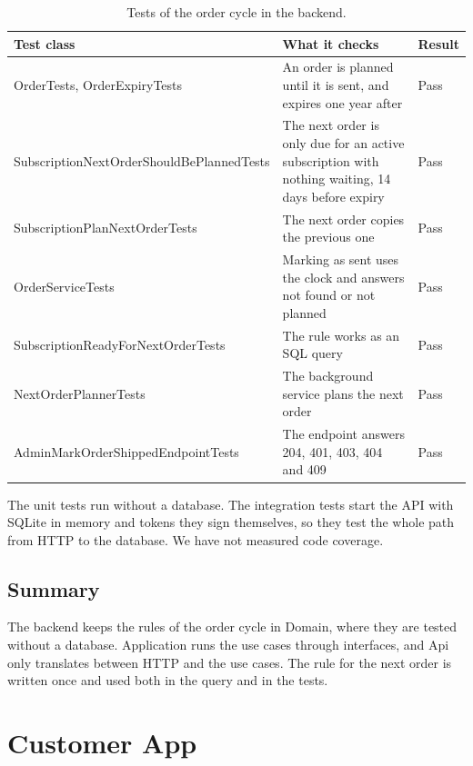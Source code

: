 \begin{table}[H]
    \centering
    \begin{tabular}{@{}p{5.6cm} p{6.6cm} l@{}}
        \hline
        Test class & What it checks & Result \\
        \hline
        OrderTests, OrderExpiryTests & An order is planned until it is sent, and expires one year after & Pass \\
        SubscriptionNextOrderShouldBePlannedTests & The next order is only due for an active subscription with nothing waiting, 14 days before expiry & Pass \\
        SubscriptionPlanNextOrderTests & The next order copies the previous one & Pass \\
        OrderServiceTests & Marking as sent uses the clock and answers not found or not planned & Pass \\
        SubscriptionReadyForNextOrderTests & The rule works as an SQL query & Pass \\
        NextOrderPlannerTests & The background service plans the next order & Pass \\
        AdminMarkOrderShippedEndpointTests & The endpoint answers 204, 401, 403, 404 and 409 & Pass \\
        \hline
    \end{tabular}
    \caption{Tests of the order cycle in the backend.}
    \label{tab:design-backend-tests}
\end{table}

The unit tests run without a database. The integration tests start the API with SQLite in
memory and tokens they sign themselves, so they test the whole path from HTTP to the
database. We have not measured code coverage.

\subsection{Summary}

The backend keeps the rules of the order cycle in Domain, where they are tested without a
database. Application runs the use cases through interfaces, and Api only translates
between HTTP and the use cases. The rule for the next order is written once and used both
in the query and in the tests.

\section{Customer App}\label{sec:design-customer-app}

